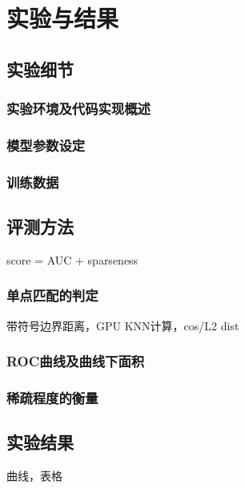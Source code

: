 
\chapter{实验与结果}

\section{实验细节}

\subsection{实验环境及代码实现概述}

\subsection{模型参数设定}

\subsection{训练数据}


\section{评测方法}

score = AUC + sparseness

\subsection{单点匹配的判定}
带符号边界距离，GPU KNN计算，cos/L2 dist

\subsection{ROC曲线及曲线下面积}

\subsection{稀疏程度的衡量}


\section{实验结果}
曲线，表格




